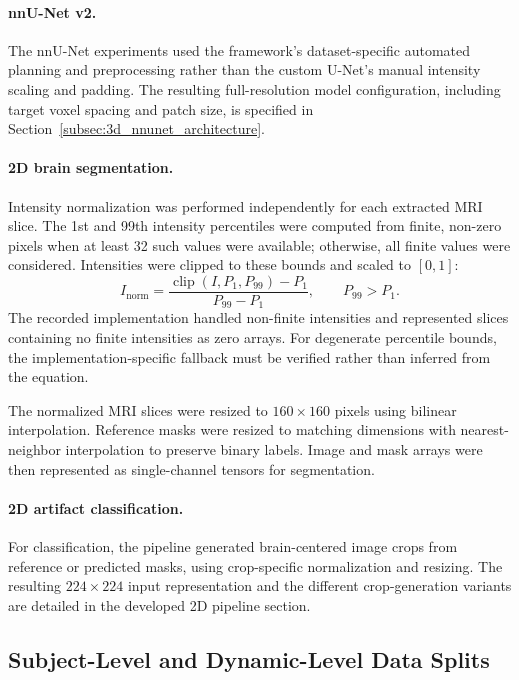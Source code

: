 \paragraph{nnU-Net v2.}
The nnU-Net experiments used the framework's dataset-specific automated planning and preprocessing rather than the custom U-Net's manual intensity scaling and padding. The resulting full-resolution model configuration, including target voxel spacing and patch size, is specified in Section~\ref{subsec:3d_nnunet_architecture}.

\paragraph{2D brain segmentation.}
Intensity normalization was performed independently for each extracted MRI slice. The 1st and 99th intensity percentiles were computed from finite, non-zero pixels when at least 32 such values were available; otherwise, all finite values were considered. Intensities were clipped to these bounds and scaled to $[0,1]$:
\begin{equation}
I_{\mathrm{norm}}=
\frac{\operatorname{clip}(I,P_1,P_{99})-P_1}{P_{99}-P_1},
\qquad P_{99}>P_1.
\end{equation}
The recorded implementation handled non-finite intensities and represented slices containing no finite intensities as zero arrays. For degenerate percentile bounds, the implementation-specific fallback must be verified rather than inferred from the equation.

The normalized MRI slices were resized to $160\times160$ pixels using bilinear interpolation. Reference masks were resized to matching dimensions with nearest-neighbor interpolation to preserve binary labels. Image and mask arrays were then represented as single-channel tensors for segmentation.

\paragraph{2D artifact classification.}
For classification, the pipeline generated brain-centered image crops from reference or predicted masks, using crop-specific normalization and resizing. The resulting $224\times224$ input representation and the different crop-generation variants are detailed in the developed 2D pipeline section.

\subsection{Subject-Level and Dynamic-Level Data Splits}

